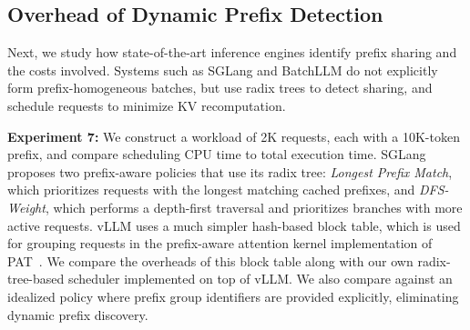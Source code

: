 \begin{table}[t]
\centering
\small
{}
\caption{Overhead of Dynamic Prefix Detection}
\label{tab:cost_schedulers}
\vspace{-20pt}
\end{table}

\vspace{-8pt}

\subsection{Overhead of Dynamic Prefix Detection}
\label{subsec:overhead_dynamic_prefix_detection}
Next, we study how state-of-the-art inference engines identify prefix sharing and the costs involved. Systems such as SGLang \cite{zheng2024sglangefficientexecutionstructured} and BatchLLM \cite{zheng2025batchllmoptimizinglargebatched} do not explicitly form prefix-homogeneous batches, but use radix trees to detect sharing, and schedule requests to minimize KV recomputation. 

\textbf{Experiment 7:} We construct a workload of 2K requests, each with a 10K-token prefix, and compare scheduling CPU time to total execution time. SGLang proposes two prefix-aware policies that use its radix tree: \textit{Longest Prefix Match}, which prioritizes requests with the longest matching cached prefixes, and \textit{DFS-Weight}, which performs a depth-first traversal and prioritizes branches with more active requests. vLLM uses a much simpler hash-based block table, which is used for grouping requests in the prefix-aware attention kernel implementation of PAT~\cite{yi2026pat}. We compare the overheads of this block table along with our own radix-tree-based scheduler implemented on top of vLLM. We also compare against an idealized policy where prefix group identifiers are provided explicitly, eliminating dynamic prefix discovery.

